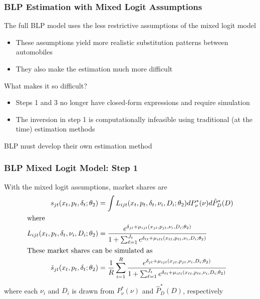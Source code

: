 \documentclass{beamer}
\begin{document}
\begin{frame}\frametitle{BLP Estimation with Mixed Logit Assumptions}
    The full BLP model uses the less restrictive assumptions of the mixed logit model
    \begin{itemize}
        \item These assumptions yield more realistic substitution patterns between automobiles
        \item They also make the estimation much more difficult
    \end{itemize}
    \vspace{2ex}
    What makes it so difficult?
    \begin{itemize}
        \item Steps 1 and 3 no longer have closed-form expressions and require simulation
        \item The inversion in step 1 is computationally infeasible using traditional (at the time) estimation methods
    \end{itemize}
    \vspace{2ex}
    BLP must develop their own estimation method
\end{frame}

\begin{frame}\frametitle{BLP Mixed Logit Model: Step 1}
    With the mixed logit assumptions, market shares are
    \begin{align*}
        s_{jt}(x_t, p_t, \delta_t; \theta_2) &= \int L_{ijt}(x_t, p_t, \delta_t, \nu_i, D_i; \theta_2) dP_{\nu}^*(\nu) d\hat{P}_D^*(D) \\
        \intertext{where}
        L_{ijt}(x_t, p_t, \delta_t, \nu_i, D_i; \theta_2) &= \frac{e^{\delta_{jt} + \mu_{ijt}(x_{jt}, p_{jt}, \nu_i, D_i; \theta_2)}}{1 + \sum_{\ell = 1}^{J_t} e^{\delta_{\ell t} + \mu_{i \ell t}(x_{\ell t}, p_{\ell t}, \nu_i, D_i; \theta_2)}} \\
        \intertext{These market shares can be simulated as}
        \check{s}_{jt}(x_t, p_t, \delta_t; \theta_2) &= \frac{1}{R} \sum_{i = 1}^R \frac{e^{\delta_{jt} + \mu_{ijt}(x_{jt}, p_{jt}, \nu_i, D_i; \theta_2)}}{1 + \sum_{\ell = 1}^{J_t} e^{\delta_{\ell t} + \mu_{i \ell t}(x_{\ell t}, p_{\ell t}, \nu_i, D_i; \theta_2)}}
    \end{align*}
    where each $\nu_i$ and $D_i$ is drawn from $P_{\nu}^*(\nu)$ and $\hat{P}_D^*(D)$, respectively
\end{frame}
\end{document}
